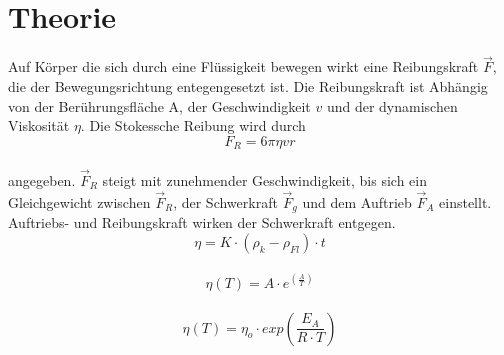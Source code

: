 \section{Theorie}
\label{sec:Theorie}

Auf Körper die sich durch eine Flüssigkeit bewegen wirkt eine Reibungskraft $\vec{F}$,
die der Bewegungsrichtung entegengesetzt ist. Die Reibungskraft ist Abhängig von der Berührungsfläche A,
der Geschwindigkeit $v$ und der dynamischen Viskosität $η$.
Die Stokessche Reibung wird durch 
\\
\begin{equation}
    F_{R} = 6πηvr
\end{equation}
\\
angegeben. $\vec{F}_R$ steigt mit zunehmender Geschwindigkeit, bis sich ein Gleichgewicht zwischen $\vec{F}_R$, der Schwerkraft $\vec{F}_g$ 
und dem Auftrieb $\vec{F}_A$ einstellt. Auftriebs- und Reibungskraft wirken der Schwerkraft entgegen.
\\
\begin{equation}
η = K \cdot (ρ_k - ρ_{Fl}) \cdot t
\end{equation}
\\
\begin{equation}
η(T) = A \cdot e^{ \left(\frac{A}{T}\right)}
\end{equation}
\\
\begin{equation}
η(T) = η_o \cdot exp \left(\frac{E_A}{R\cdot T}\right)
\end{equation}
